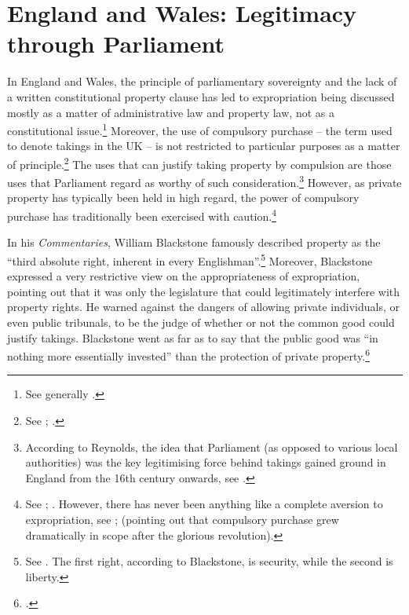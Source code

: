 \section{England and Wales: Legitimacy through Parliament}\label{sec:3:2}

In England and Wales, the principle of parliamentary sovereignty and the lack of a written constitutional property clause has led to expropriation being discussed mostly as a matter of administrative law and property law, not as a constitutional issue.\footnote{See generally \cite{taggart98}.} Moreover, the use of compulsory purchase -- the term used to denote takings in the UK -- is not restricted to particular purposes as a matter of principle.\footnote{See \cite[201]{allen00}; \cite[48-49]{waring09}.} The uses that can justify taking property by compulsion are those uses that Parliament regard as worthy of such consideration.\footnote{According to Reynolds, the idea that Parliament (as opposed to various local authorities) was the key legitimising force behind takings gained ground in England from the 16th century onwards, see \cite[41-42]{reynolds10}.} However, as private property has typically been held in high regard, the power of compulsory purchase has traditionally been exercised with caution.\footnote{See \cite[15]{allen00}; \cite[47-48]{waring09}. However, there has never been anything like a complete aversion to expropriation, see \cite[34-46]{reynolds10}; \cite[126-128]{hoppit11} (pointing out that compulsory purchase grew dramatically in scope after the glorious revolution).}

In his {\it Commentaries}, William Blackstone famously described property as the ``third absolute right, inherent in every Englishman''.\footnote{See \cite[134-135]{blackstone79}. The first right, according to Blackstone, is security, while the second is liberty.} Moreover, Blackstone expressed a very restrictive view on the appropriateness of expropriation, pointing out that it was only the legislature that could legitimately interfere with property rights. He warned against the dangers of allowing private individuals, or even public tribunals, to be the judge of whether or not the common good could justify takings. Blackstone went as far as to say that the public good was ``in nothing more essentially invested'' than the protection of private property.\footcite[134-135]{blackstone79}

